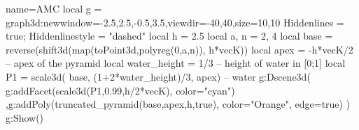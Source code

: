 \documentclass[12pt]{standalone}
\begin{document}
\begin{luadraw}{name=AMC}
local g = graph3d:new{window={-2.5,2.5,-0.5,3.5},viewdir={-40,40},size={10,10}}
Hiddenlines = true; Hiddenlinestyle = "dashed"
local h = 2.5
local a, n = 2, 4
local base = reverse(shift3d(map(toPoint3d,polyreg(0,a,n)), h*vecK))
local apex = -h*vecK/2 -- apex of the pyramid
local water_height = 1/3 -- height of water in [0;1]
local P1 = scale3d( base, (1+2*water_height)/3, apex) -- water
g:Dscene3d(
    g:addFacet(scale3d(P1,0.99,h/2*vecK), {color="cyan"})
    ,g:addPoly(truncated_pyramid(base,apex,h,true), {color="Orange", edge=true})
)
g:Show()
\end{luadraw}
\end{document}
